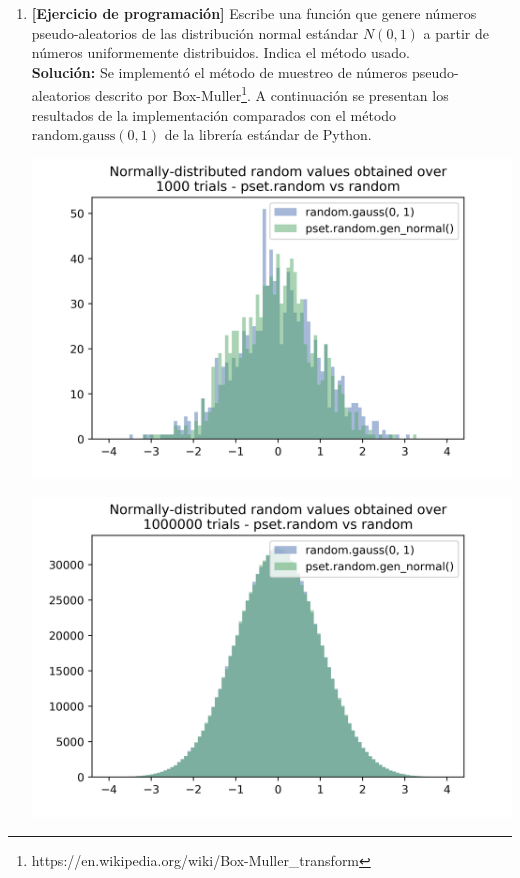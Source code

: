 \documentclass[10pt,letterpaper]{article}
\begin{document}
\begin{enumerate}
    \item \textbf{[Ejercicio de programación]} Escribe una función que genere números
          pseudo-aleatorios de las distribución normal estándar $N(0, 1)$ a partir de
          números uniformemente distribuidos. Indica el método usado. \\[\baselineskip]

        \textbf{Solución:} Se implementó el método de muestreo de números pseudo-aleatorios
        descrito por Box-Muller\footnote{https://en.wikipedia.org/wiki/Box-Muller\_transform}.
        A continuación se presentan los resultados de la implementación comparados con el
        método $\mathrm{random.gauss(0, 1)}$ de la librería estándar de Python.
        \begin{center}
            \includegraphics[scale=.6]{./assets/ex1-results1.png}
        \end{center}
        \begin{center}
            \includegraphics[scale=.6]{./assets/ex1-results2.png}
        \end{center}
\end{enumerate}
\end{document}
